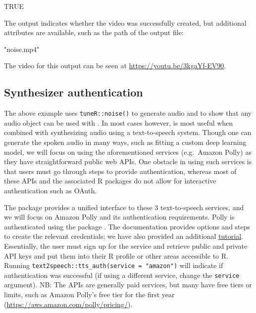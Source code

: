 \begin{Schunk}
\begin{Soutput}
[1] TRUE
\end{Soutput}
\end{Schunk}

The output indicates whether the video was successfully created, but
additional attributes are available, such as the path of the output
file:

\begin{Schunk}
\end{Schunk}

\begin{Schunk}
\begin{Soutput}
[1] "noise.mp4"
\end{Soutput}
\end{Schunk}

The video for this output can be seen at
\url{https://youtu.be/3kgaYf-EV90}.

\hypertarget{synthesizer-authentication}{%
\subsection{Synthesizer
authentication}\label{synthesizer-authentication}}

The above example uses \texttt{tuneR::noise()} to generate audio and to
show that any audio object can be used with . In most cases
however,  is most useful when combined with synthesizing audio
using a text-to-speech system. Though one can generate the spoken audio
in many ways, such as fitting a custom deep learning model, we will
focus on using the aforementioned services (e.g.~Amazon Polly) as they
have straightforward public web APIs. One obstacle in using such
services is that users must go through steps to provide authentication,
whereas most of these APIs and the associated R packages do not allow
for interactive authentication such as OAuth.

The  package provides a unified interface to these 3
text-to-speech services, and we will focus on Amazon Polly and its
authentication requirements. Polly is authenticated using the
 package \citep{aws.signature}. The
 documentation provides options and steps to create
the relevant credentials; we have also provided an additional
\href{http://seankross.com/2017/05/02/Access-Amazon-Web-Services-in-R.html}{tutorial}.
Essentially, the user must sign up for the service and retrieve public
and private API keys and put them into their R profile or other areas
accessible to R. Running
\texttt{text2speech::tts\_auth(service\ =\ "amazon")} will indicate if
authentication was successful (if using a different service, change the
\texttt{service} argument). NB: The APIs are generally paid services,
but many have free tiers or limits, such as Amazon Polly's free tier for
the first year (\url{https://aws.amazon.com/polly/pricing/}).

